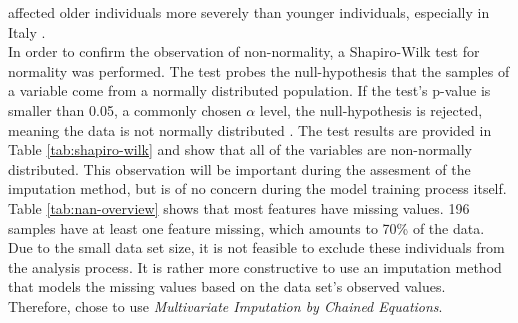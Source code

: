 affected older individuals more severely than younger individuals, especially 
in Italy \cite{RN193}. 
\\
In order to confirm the observation of non-normality, a Shapiro-Wilk test for 
normality was performed.
The test probes the null-hypothesis that the samples of a variable come from a 
normally distributed population. If the test's p-value is smaller than 
0.05, a commonly chosen $\alpha$ level, the null-hypothesis is rejected, 
meaning the data is not normally distributed \cite{RN196}.
The test results are provided in Table \ref{tab:shapiro-wilk} and show 
that all of the variables are non-normally distributed. This observation will 
be important during the assesment of the imputation method, but is of no 
concern during the model training process itself.
\\
Table \ref{tab:nan-overview} shows that most features have missing values. 196 
samples have at least one feature missing, which amounts to 70\% of the data. 
Due to the small data set size, it is not feasible to exclude these 
individuals from the analysis process. It is rather more constructive to use an 
imputation method that models the missing values based on the data set's 
observed values. Therefore, \citeauthor{RN127} chose to use 
\textit{Multivariate 
Imputation by Chained Equations}. 
